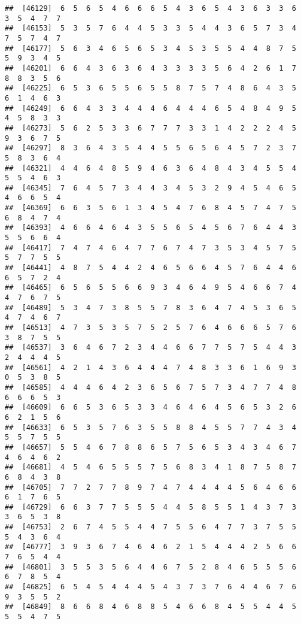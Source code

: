 \documentclass[
]{book}
\begin{document}
\begin{verbatim}
##  [46129]  6  5  6  5  4  6  6  6  5  4  3  6  5  4  3  6  3  3  6  3  5  4  7  7
##  [46153]  5  3  5  7  6  4  4  5  3  3  5  4  4  3  6  5  7  3  4  7  5  7  4  7
##  [46177]  5  6  3  4  6  5  6  5  3  4  5  3  5  5  4  4  8  7  5  5  9  3  4  5
##  [46201]  6  6  4  3  6  3  6  4  3  3  3  3  5  6  4  2  6  1  7  8  8  3  5  6
##  [46225]  6  5  3  6  5  5  6  5  5  8  7  5  7  4  8  6  4  3  5  6  1  4  6  3
##  [46249]  6  6  4  3  3  4  4  4  6  4  4  4  6  5  4  8  4  9  5  4  5  8  3  3
##  [46273]  5  6  2  5  3  3  6  7  7  7  3  3  1  4  2  2  2  4  5  9  3  6  7  5
##  [46297]  8  3  6  4  3  5  4  4  5  5  6  5  6  4  5  7  2  3  7  5  8  3  6  4
##  [46321]  4  4  6  4  8  5  9  4  6  3  6  4  8  4  3  4  5  5  4  5  5  4  6  3
##  [46345]  7  6  4  5  7  3  4  4  3  4  5  3  2  9  4  5  4  6  5  4  6  6  5  4
##  [46369]  6  6  3  5  6  1  3  4  5  4  7  6  8  4  5  7  4  7  5  6  8  4  7  4
##  [46393]  4  6  6  4  6  4  3  5  5  6  5  4  5  6  7  6  4  4  3  5  5  6  6  4
##  [46417]  7  4  7  4  6  4  7  7  6  7  4  7  3  5  3  4  5  7  5  5  7  7  5  5
##  [46441]  4  8  7  5  4  4  2  4  6  5  6  6  4  5  7  6  4  4  6  6  5  7  2  4
##  [46465]  6  5  6  5  5  6  6  9  3  4  6  4  9  5  4  6  6  7  4  4  7  6  7  5
##  [46489]  5  3  4  7  3  8  5  5  7  8  3  6  4  7  4  5  3  6  5  4  7  4  6  7
##  [46513]  4  7  3  5  3  5  7  5  2  5  7  6  4  6  6  6  5  7  6  3  8  7  5  5
##  [46537]  3  6  4  6  7  2  3  4  4  6  6  7  7  5  7  5  4  4  3  2  4  4  4  5
##  [46561]  4  2  1  4  3  6  4  4  4  7  4  8  3  3  6  1  6  9  3  0  5  3  8  5
##  [46585]  4  4  4  6  4  2  3  6  5  6  7  5  7  3  4  7  7  4  8  6  6  6  5  3
##  [46609]  6  6  5  3  6  5  3  3  4  6  4  6  4  5  6  5  3  2  6  6  2  1  5  6
##  [46633]  6  5  3  5  7  6  3  5  5  8  8  4  5  5  7  7  4  3  4  5  5  7  5  5
##  [46657]  5  5  4  6  7  8  8  6  5  7  5  6  5  3  4  3  4  6  7  4  6  4  6  2
##  [46681]  4  5  4  6  5  5  5  7  5  6  8  3  4  1  8  7  5  8  7  6  8  4  3  8
##  [46705]  7  7  2  7  7  8  9  7  4  7  4  4  4  4  5  6  4  6  6  6  1  7  6  5
##  [46729]  6  6  3  7  7  5  5  5  4  4  5  8  5  5  1  4  3  7  3  3  6  5  3  8
##  [46753]  2  6  7  4  5  5  4  4  7  5  5  6  4  7  7  3  7  5  5  5  4  3  6  4
##  [46777]  3  9  3  6  7  4  6  4  6  2  1  5  4  4  4  2  5  6  6  7  6  5  4  4
##  [46801]  3  5  5  3  5  6  4  4  6  7  5  2  8  4  6  5  5  5  6  6  7  8  5  4
##  [46825]  6  5  4  5  4  4  4  5  4  3  7  3  7  6  4  4  6  7  6  9  3  5  5  2
##  [46849]  8  6  6  8  4  6  8  8  5  4  6  6  8  4  5  5  4  4  5  5  5  4  7  5

\end{verbatim}
\end{document}
